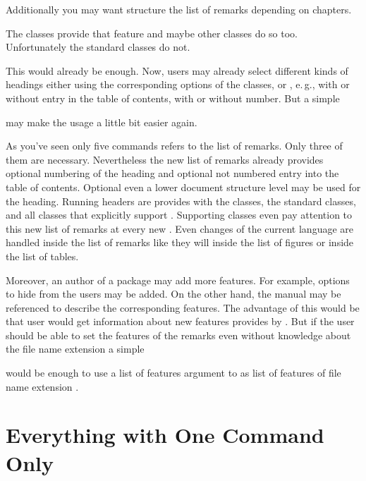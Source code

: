 Additionally you may want structure the list of
remarks depending on chapters.
\begin{lstcode}
\end{lstcode}
The \KOMAScript{} classes provide that feature and maybe other classes do so
too. Unfortunately the standard classes do not.

This would already be enough. Now, users may already
select different kinds of headings either using the corresponding options of
the \KOMAScript{} classes, or , e.\,g., with or without entry
in the table of contents, with or without number. But a simple
\begin{lstcode}
  \newcommand*{\listofremarkboxes}{\listoftoc{lor}}
\end{lstcode}
may make the usage a little bit easier again.

As you've seen only five commands refers to the list of remarks. Only three of
them are necessary. Nevertheless the new list of remarks already provides
optional numbering of the heading and optional not numbered entry into the
table of contents. Optional even a lower document structure level may be used
for the heading. Running headers are provides with the \KOMAScript{} classes,
the standard classes, and all classes that explicitly support
. Supporting classes even pay attention to this new list of
remarks at every new . Even changes of the current language are
handled inside the list of remarks like they will inside the list of figures
or inside the list of tables.

Moreover, an author of a package may add more
features. For example, options to hide  from the users may be
added. On the other hand, the  manual may be referenced to
describe the corresponding features. The advantage of this would be that user
would get information about new features provides by . But
if the user should be able to set the features of the remarks even without
knowledge about the file name extension  a simple
\begin{lstcode}
  \newcommand*{\setupremarkboxes}{\setuptoc{lor}}
\end{lstcode}
would be enough to use a list of features argument to
 as list of features of file name extension .

\section{Everything with One Command Only}
\label{sec:tocbasic.highlevel}

